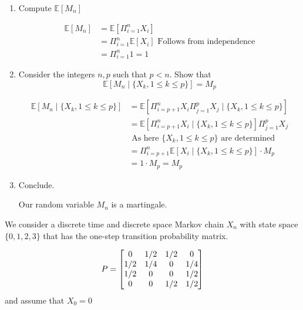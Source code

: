 \documentclass[12pt,twoside, letter]{exam}
\theoremstyle{definition}
\newcommand{\ee}{\mathbb{E}}
\begin{document}
\begin{enumerate}
  \item Compute $\ee[M_n]$
    \begin{solution}
      \begin{align*}
        \ee[M_n] &= \ee[\Pi^{n}_{i=1} X_i] \\
        &= \Pi^{n}_{i=1} \ee[X_i] \text{ Follows from independence} \\
        &= \Pi^{n}_{i=1} 1 = 1
      \end{align*}
    \end{solution}
  \item Consider the integers $n,p$ such that $p < n$. Show that
    \begin{equation*}
      \ee[M_n \mid \{X_k, 1 \leq k \leq p\}] = M_p
    \end{equation*}

    \begin{solution}
      \begin{align*}
        \ee[M_n \mid \{X_k, 1 \leq k \leq p\}] &= \ee[\Pi^{n}_{i=p+1} X_{i}\Pi^{p}_{j=1} X_{j} \mid \{X_k, 1 \leq k \leq p\}] \\
        &= \ee[\Pi^{n}_{i=p+1} X_{i} \mid \{X_k, 1 \leq k \leq p\}]\Pi^{p}_{j=1} X_{j} \\
        &\text{ As here $\{X_k, 1 \leq k \leq p\}$ are determined} \\
        &= \Pi^{n}_{i=p+1}\ee[ X_{i} \mid \{X_k, 1 \leq k \leq p\}]\cdot M_p \\
        &= 1 \cdot M_p = M_p
      \end{align*}
    \end{solution}
  \item Conclude.
    \begin{solution}
      Our random variable $M_n$ is a martingale.
    \end{solution}
\end{enumerate}

 We consider a discrete time and discrete space Markov chain $X_n$ with state space $\{0, 1, 2, 3\}$ that
has the one-step transition probability matrix.

\begin{align*}
  \centering
    P =
  \begin{bmatrix}
    0 & 1/2 & 1/2 & 0 \\
    1/2 & 1/4 & 0 & 1/4 \\
    1/2 & 0 & 0 & 1/2 \\
    0 & 0 & 1/2 & 1/2
  \end{bmatrix}
\end{align*}
and assume that $X_0 = 0$
\end{document}
